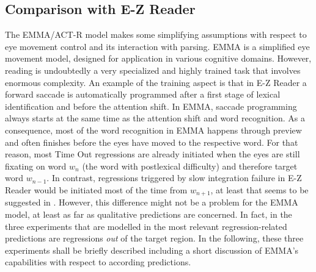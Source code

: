 \documentclass{cambridge7A}\usepackage[]{graphicx}\usepackage[]{color}
\begin{document}
\subsection{Comparison with E-Z Reader}
The EMMA/ACT-R model makes some simplifying assumptions with respect to eye movement control and its interaction with parsing. 
EMMA is a simplified eye movement model, designed for application in various cognitive domains.  However, reading is undoubtedly a very specialized and highly trained task that involves enormous complexity. An example of the training aspect is that in E-Z Reader a forward saccade is automatically programmed after a first stage of lexical identification and before the attention shift.  In EMMA, saccade programming always starts at the same time as the attention shift and word recognition.  As a consequence, most of the word recognition in EMMA happens through preview and often finishes before the eyes have moved to the respective word.  For that reason, most Time Out regressions are already initiated when the eyes are still fixating on word $w_n$ (the word with postlexical difficulty) and therefore target word $w_{n-1}$.
In contrast, regressions triggered by slow integration failure in E-Z Reader would be initiated most of the time from $w_{n+1}$, at least that seems to be suggested in \cite{ReichleWarrenMcConnell2009}. However, this difference might not be a problem for the EMMA model, at least as far as qualitative predictions are concerned. In fact, in the three  experiments that are modelled in \cite{ReichleWarrenMcConnell2009} the most relevant regression-related predictions are regressions \emph{out} of the target region. 
In the following, these three experiments shall be briefly described including a short discussion of EMMA's capabilities with respect to according predictions. 
\end{document}
